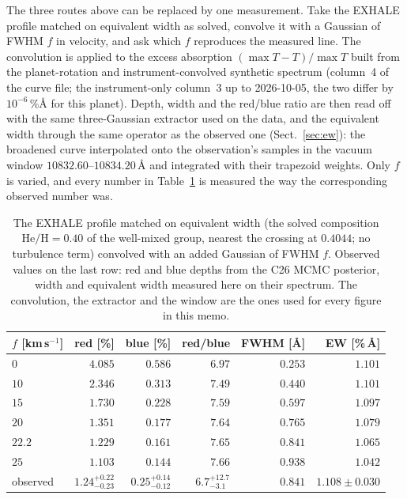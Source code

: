 \documentclass[english,a4paper]{my_memo}
\begin{document}
The three routes above can be replaced by one measurement. Take the EXHALE
profile matched on equivalent width as solved, convolve it with a Gaussian of
FWHM $f$ in velocity, and ask which $f$ reproduces the measured line. The
convolution is applied to the excess absorption $(\max T - T)/\max T$ built
from the planet-rotation and instrument-convolved synthetic spectrum (column~4
of the curve file; the instrument-only column~3 up to 2026-10-05, the two
differ by $10^{-6}$\,\%\AA{} for this planet). Depth, width and the
red/blue ratio are then read off with the same three-Gaussian extractor used
on the data, and the equivalent width through the same operator as the
observed one (Sect.~\ref{sec:ew}): the broadened curve interpolated onto the
observation's samples in the vacuum window $10832.60$--$10834.20$\,\AA{} and
integrated with their trapezoid weights. Only $f$ is varied, and every number in
Table~\ref{tab:broadening} is measured the way the corresponding observed
number was.

\begin{table}[htbp]\centering
\caption{The EXHALE profile matched on equivalent width (the solved
composition $\mathrm{He/H} = 0.40$ of the well-mixed group, nearest the
crossing at $0.4044$; no turbulence term) convolved with an added Gaussian of
FWHM $f$. Observed values on the last row: red and blue depths from the C26
MCMC posterior, width and equivalent width measured here on their spectrum.
The convolution, the extractor and the window are the ones used for every
figure in this memo.}
\label{tab:broadening}
\begin{tabular}{lrrrrr}
\toprule
$f$ [km\,s$^{-1}$] & red [\%] & blue [\%] & red/blue & FWHM [\AA] &
EW [\%\,\AA] \\
\midrule
$0$   & $4.085$ & $0.586$ & $6.97$ & $0.253$ & $1.101$ \\
$10$  & $2.346$ & $0.313$ & $7.49$ & $0.440$ & $1.101$ \\
$15$  & $1.730$ & $0.228$ & $7.59$ & $0.597$ & $1.097$ \\
$20$  & $1.351$ & $0.177$ & $7.64$ & $0.765$ & $1.079$ \\
$\mathbf{22.2}$ & $\mathbf{1.229}$ & $\mathbf{0.161}$ & $\mathbf{7.65}$ &
$\mathbf{0.841}$ & $\mathbf{1.065}$ \\
$25$  & $1.103$ & $0.144$ & $7.66$ & $0.938$ & $1.042$ \\
\midrule
observed & $1.24^{+0.22}_{-0.23}$ & $0.25^{+0.14}_{-0.12}$ &
$6.7^{+12.7}_{-3.1}$ & $0.841$ & $1.108 \pm 0.030$ \\
\bottomrule
\end{tabular}
\end{table}
\end{document}
